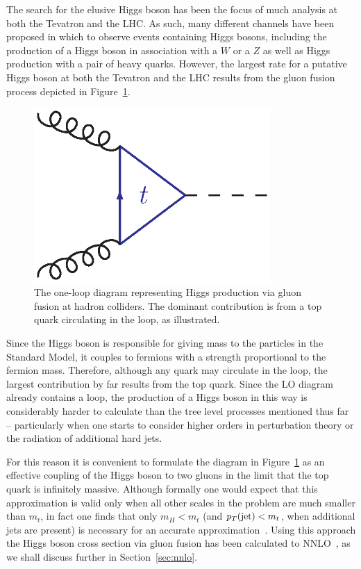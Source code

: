 \documentclass[12pt]{iopart}
\begin{document}
The search for the elusive Higgs boson has been the focus of much analysis at both the Tevatron and the LHC. As such, many
different channels have been proposed in which to observe events containing Higgs bosons, including the production of a Higgs
boson in association with a $W$ or a $Z$ as well as Higgs production with a pair of heavy quarks. However, the largest rate
for a putative Higgs boson at both the Tevatron and the LHC results from the gluon fusion process depicted in
Figure~\ref{fig:Hgg}.
%
\begin{figure}[t]
\begin{center}    
\includegraphics[width=9cm]{g_hgg.ps}    
\end{center}    
\caption{The one-loop diagram representing Higgs production via gluon fusion at hadron colliders. The dominant contribution
is from a top quark circulating in the loop, as illustrated.}
\label{fig:Hgg}
\end{figure}
%
Since the Higgs boson is responsible for giving mass to the particles in the Standard Model, it couples to fermions with a
strength proportional to the fermion mass. Therefore, although any quark may circulate in the loop, the largest contribution by
far results from the top quark. Since the LO diagram already contains a loop, the production of a Higgs boson in
this way is considerably harder to calculate than the tree level processes mentioned thus far -- particularly when one starts to
consider higher orders in perturbation theory or the radiation of additional hard jets.

For this reason it is convenient to formulate
the diagram in Figure~\ref{fig:Hgg} as an effective coupling of the Higgs boson to two gluons in the limit that the top
quark is infinitely massive. Although formally one would expect that this approximation is valid only when all other scales in
the problem are much smaller than $m_t$, in fact one finds that only $m_H < m_t$ (and $p_T({\rm jet}) < m_t$, when additional
jets are present) is necessary for an accurate approximation~\cite{DelDuca:2001fn}. Using this approach the Higgs boson
cross section via gluon fusion has been calculated to NNLO~\cite{Harlander:2002wh,Anastasiou:2002yz}, as we shall discuss
further in Section~\ref{sec:nnlo}.
\end{document}

